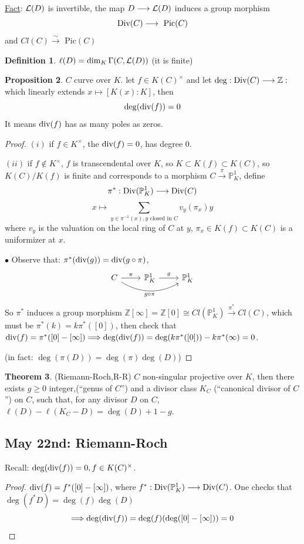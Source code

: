 \documentclass[11pt]{article}
\theoremstyle{definition}
\newtheorem{thm}{Theorem}[section]
\newtheorem{prop}[thm]{Proposition}
\newtheorem{dfn}[thm]{Definition}
\newcommand{\pic}{\text{ Pic}}
\newcommand{\proj}{\mathbb P}
\newcommand{\intg}{\mathbb Z}
\newcommand{\call}{{\cal L}}
\renewcommand{\div}{\textnormal{div}}
\newcommand{\Div}{\textnormal{Div}}
\newcommand{\Lrta}{\Longrightarrow}
\newcommand{\lrta}{\longrightarrow}
\begin{document}
\underline{Fact}: $\call(D)$ is invertible, the map $D\lrta\call(D)$ induces a group morphism
$$
\Div(C)\lrta\pic(C)
$$
and $Cl(C)\overset{\sim}{\lrta}\pic(C)$
\begin{dfn}
$\ell(D)=\dim_K\Gamma(C,\call(D))$ (it is finite)
\end{dfn}
\begin{prop}
$C$ curve over $K$. let $f\in K(C)^\times$ and let $\deg:\Div(C)\lrta \intg:$ which linearly extends $ x\longmapsto[K(x):K]$, then
$$
\deg(\div(f))=0
$$
It means $\div(f)$ has as many poles as zeros.
\end{prop}
\begin{proof}
$(i)$ if $f\in K^\times$, the $\div(f)=0$, has degree $0$.

$(ii)$ if $f\notin K^\times$, $f$ is transcendental over $K$, so $K\subset K(f)\subset K(C)$, so $K(C)/K(f)$ is finite and corresponds to a morphism
$C\overset{\pi}{\lrta}\proj^1_K$, define 
$$
\pi^*: \Div(\proj^1_K)\lrta \Div(C)
$$
$$
x\longmapsto \sum_{y\in \pi^{-1}(x), y\text{ closed in }C} v_y(\pi_x)y
$$
where $v_y$ is the valuation on the local ring of $C$ at $y$, $\pi_x\in K(f)\subset K(C)$ is a uniformizer at $x$.

$\bullet$ Observe that: $\pi^*(\div(g))=\div(g\circ \pi)$, 
$$
\begin{tikzcd}
C \arrow[r, "\pi"] \arrow[rr, "g\circ\pi"', bend right] & \proj^1_K \arrow[r, "g"] & \proj^1_K
\end{tikzcd}
$$
So $\pi^*$ induces a group morphism $\intg[\infty]=\intg[0]\cong Cl(\proj^1_K)\overset{\pi^*}{\lrta}Cl(C)$, which must be $\pi^*(k)=k\pi^*([0])$, then check that $\div(f)=\pi^*([0]-[\infty])\Lrta \deg(\div(f))=\deg(k\pi^*([0]))-k\pi^*(\infty)=0$.

(in fact: $\deg(\pi(D))=\deg(\pi)\deg(D)$)
\end{proof}
\begin{thm}
(Riemann-Roch,R-R) $C$ non-singular projective over $K$, then there exists $g\geq 0$ integer,(``genus of $C$'') and a divisor class $K_C$ (``canonical divisor of $C$'') on $C$, such that, for any divisor $D$ on $C$, $\ell(D)-\ell(K_C-D)=\deg(D)+1-g$.
\end{thm}
\subsection{May 22nd: Riemann-Roch}
Recall: $\deg(\div(f))=0, f\in K(C)^\times$.
\begin{proof}
$\div(f)=f^*([0]-[\infty])$, where $f^*: \Div(\proj^1_K)\lrta \Div(C)$. One checks that $\deg(f^*D)=\deg (f)\deg(D)$
$$
\Lrta \deg(\div(f))=\deg(f)(\deg([0]-[\infty]))=0
$$
\end{proof}
\end{document}
